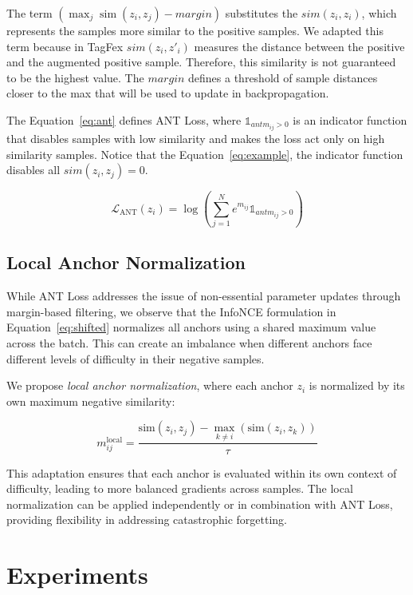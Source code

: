 \documentclass[letterpaper]{article} %
\begin{document}
The term $(\max_{j} \operatorname{sim}(z_i, z_j) - margin)$ substitutes the $sim(z_i,z_i)$, which represents the samples more similar to the positive samples. We adapted this term because in TagFex $sim(z_i,z'_i)$ measures the distance between the positive and the augmented positive sample. Therefore, this similarity is not guaranteed to be the highest value. The $margin$ defines a threshold of sample distances closer to the max that will be used to update in backpropagation.  

The Equation~\ref{eq:ant} defines ANT Loss, where ${\mathds{1}_{antm_{ij} > 0}}$ is an indicator function that disables samples with low similarity and makes the loss act only on high similarity samples. Notice that the Equation~\ref{eq:example}, the indicator function disables all $sim(z_i,z_j)=0$.

\begin{equation}\label{eq:ant}
\mathcal{L}_{\text{ANT}} (z_i) =  \log \left( \sum_{j=1}^{N}  e^{m_{ij}} {\mathds{1}_{antm_{ij} > 0}} \right)
\end{equation}

\subsection{Local Anchor Normalization}

While ANT Loss addresses the issue of non-essential parameter updates through margin-based filtering, we observe that the InfoNCE formulation in Equation~\ref{eq:shifted} normalizes all anchors using a shared maximum value across the batch. This can create an imbalance when different anchors face different levels of difficulty in their negative samples.

We propose \textit{local anchor normalization}, where each anchor $z_i$ is normalized by its own maximum negative similarity:

\begin{equation}\label{eq:local_max}
m_{ij}^{\text{local}} = \frac{\text{sim}(z_i, z_j) - \max_{k \neq i}(\text{sim}(z_i, z_k))}{\tau}
\end{equation}

This adaptation ensures that each anchor is evaluated within its own context of difficulty, leading to more balanced gradients across samples. The local normalization can be applied independently or in combination with ANT Loss, providing flexibility in addressing catastrophic forgetting.

\section{Experiments}
\end{document}
